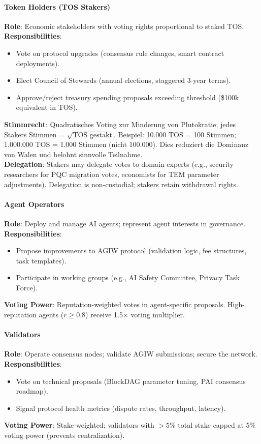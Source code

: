 \documentclass[11pt]{article}
\begin{document}
\paragraph{Token Holders (TOS Stakers)}
\textbf{Role}: Economic stakeholders with voting rights proportional to staked TOS.\\
\textbf{Responsibilities}:
\begin{itemize}[noitemsep]
  \item Vote on protocol upgrades (consensus rule changes, smart contract deployments).
  \item Elect Council of Stewards (annual elections, staggered 3-year terms).
  \item Approve/reject treasury spending proposals exceeding threshold (\$100k equivalent in TOS).
\end{itemize}
\textbf{Stimmrecht}: Quadratisches Voting zur Minderung von Plutokratie; jedes Stakers Stimmen = $\sqrt{\text{TOS gestakt}}$. Beispiel: 10.000 TOS = 100 Stimmen; 1.000.000 TOS = 1.000 Stimmen (nicht 100.000). Dies reduziert die Dominanz von Walen und belohnt sinnvolle Teilnahme.\\
\textbf{Delegation}: Stakers may delegate votes to domain experts (e.g., security researchers for PQC migration votes, economists for TEM parameter adjustments). Delegation is non-custodial; stakers retain withdrawal rights.

\paragraph{Agent Operators}
\textbf{Role}: Deploy and manage AI agents; represent agent interests in governance.\\
\textbf{Responsibilities}:
\begin{itemize}[noitemsep]
  \item Propose improvements to AGIW protocol (validation logic, fee structures, task templates).
  \item Participate in working groups (e.g., AI Safety Committee, Privacy Task Force).
\end{itemize}
\textbf{Voting Power}: Reputation-weighted votes in agent-specific proposals. High-reputation agents ($r \geq 0.8$) receive 1.5$\times$ voting multiplier.

\paragraph{Validators}
\textbf{Role}: Operate consensus nodes; validate AGIW submissions; secure the network.\\
\textbf{Responsibilities}:
\begin{itemize}[noitemsep]
  \item Vote on technical proposals (BlockDAG parameter tuning, PAI consensus roadmap).
  \item Signal protocol health metrics (dispute rates, throughput, latency).
\end{itemize}
\textbf{Voting Power}: Stake-weighted; validators with $>5\%$ total stake capped at 5\% voting power (prevents centralization).
\end{document}
